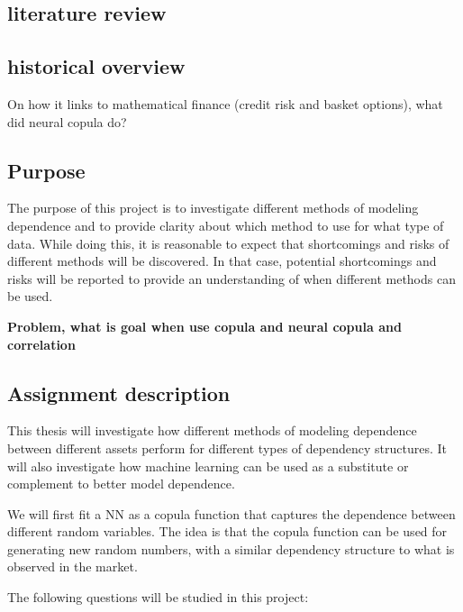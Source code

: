 \subsection{literature review}

\subsection{historical overview }
\begin{generalinstructions}
    On how it links to mathematical finance (credit risk and basket options), what did neural copula do?
\end{generalinstructions}

 
\subsection{Purpose}\label{Purpose}
The purpose of this project is to investigate different methods of modeling dependence and to provide clarity about which method to use for what type of data. While doing this, it is reasonable to expect that shortcomings and risks of different methods will be discovered. In that case, potential shortcomings and risks will be reported to provide an understanding of when different methods can be used. 


\textbf{Problem, what is goal
when use copula and neural copula and correlation}


\subsection{Assignment description}
This thesis will investigate how different methods of modeling dependence between different assets perform for different types of dependency structures. It will also investigate how machine learning can be used as a substitute or complement to better model dependence. 

We will first fit a \gls{NN} as a copula function that captures the dependence between different random variables. The idea is that the copula function can be used for generating new random numbers, with a similar dependency structure to what is observed in the market.   

The following questions will be studied in this project:

